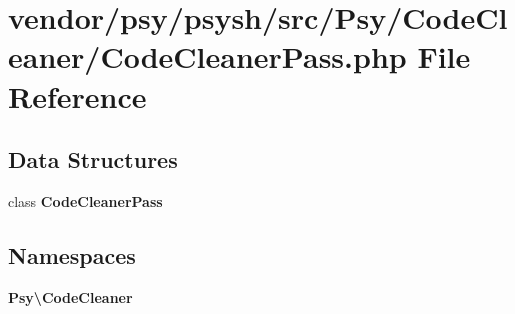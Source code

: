 \section{vendor/psy/psysh/src/\+Psy/\+Code\+Cleaner/\+Code\+Cleaner\+Pass.php File Reference}
\label{_code_cleaner_pass_8php}
\subsection*{Data Structures}
\begin{DoxyCompactItemize}
\item 
class {\bf Code\+Cleaner\+Pass}
\end{DoxyCompactItemize}
\subsection*{Namespaces}
\begin{DoxyCompactItemize}
\item 
 {\bf Psy\textbackslash{}\+Code\+Cleaner}
\end{DoxyCompactItemize}

